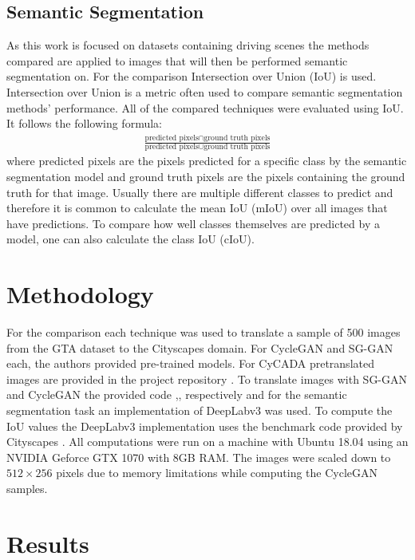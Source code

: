 \subsection{Semantic Segmentation}
As this work is focused on datasets containing driving scenes the methods compared are applied to images that will then be performed semantic segmentation on. For the comparison Intersection over Union (IoU) is used. Intersection over Union is a metric often used to compare semantic segmentation methods' performance. All of the compared techniques were evaluated using IoU. It follows the following formula:
\begin{align*}
	\frac{\text{predicted pixels} \cap \text{ground truth pixels}}{\text{predicted pixels} \cup \text{ground truth pixels}}
\end{align*}
where predicted pixels are the pixels predicted for a specific class by the semantic segmentation model and ground truth pixels are the pixels containing the ground truth for that image. Usually there are multiple different classes to predict and therefore it is common to calculate the mean IoU (mIoU) over all images that have predictions. To compare how well classes themselves are predicted by a model, one can also calculate the class IoU (cIoU).

\section{Methodology}
For the comparison each technique was used to translate a sample of 500 images from the GTA dataset to the Cityscapes domain. For CycleGAN and SG-GAN each, the authors provided pre-trained models. For CyCADA pretranslated images are provided in the project repository \cite{CyCADA}. To translate images with SG-GAN and CycleGAN the provided code \cite{SG},\cite{Cycle}, respectively and for the semantic segmentation task an implementation \cite{DLR} of DeepLabv3 \cite{DBLP:journals/corr/ChenPSA17} was used. To compute the IoU values the DeepLabv3 implementation uses the benchmark code provided by Cityscapes \cite{CSR}. All computations were run on a machine with Ubuntu 18.04 using an NVIDIA Geforce GTX 1070 with 8GB RAM. The images were scaled down to $512 \times 256$ pixels due to memory limitations while computing the CycleGAN samples.

\section{Results}

